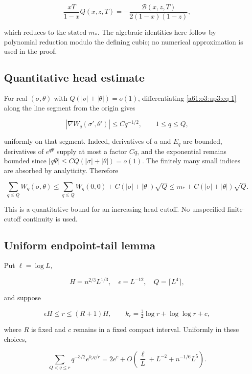 \documentclass[11pt,letterpaper]{article}
\numberwithin{equation}{section}
\theoremstyle{remark}\newtheorem{remark}[theorem]{Remark}
\begin{document}
\[
\frac{xT}{1-x}Q(x,z,T)
 =-\frac{\mathcal B(x,z,T)}{2(1-x)(1-z)},
\]

which reduces to the stated \(m_*\). The algebraic identities here
follow by polynomial reduction modulo the defining cubic; no numerical
approximation is used in the proof.

\subsection{Quantitative head estimate}

For real \((\sigma,\theta)\) with \(Q(|\sigma|+|\theta|)=o(1)\),
differentiating \eqref{a61:o3:up3:eq-1} along the line segment from the origin
gives

\[
|\nabla W_q(\sigma',\theta')|\le Cq^{-1/2},\qquad 1\le q\le Q,
\]

uniformly on that segment. Indeed, derivatives of \(a\) and \(E_q\) are
bounded, derivatives of \(e^{q\Psi}\) supply at most a factor \(Cq\),
and the exponential remains bounded since
\(|q\Psi|\le C Q(|\sigma|+|\theta|)=o(1)\). The finitely many small
indices are absorbed by analyticity. Therefore

\begin{equation}
\sum_{q\le Q}W_q(\sigma,\theta)
 \le \sum_{q\le Q}W_q(0,0)
      +C(|\sigma|+|\theta|)\sqrt Q
 \le m_*+C(|\sigma|+|\theta|)\sqrt Q.
\label{a61:o3:up3:eq-4}
\end{equation}

This is a quantitative bound for an increasing head cutoff. No
unspecified finite-cutoff continuity is used.

\subsection{Uniform endpoint-tail lemma}

Put \(\ell=\log L\),

\[
H=n^{2/3}L^{1/3},\quad \epsilon=L^{-12},\quad Q=\lceil L^4\rceil,
\]

and suppose

\[
\epsilon H\le r\le (R+1)H,\qquad
k_r=\tfrac12\log r+\log\log r+c,
\]

where \(R\) is fixed and \(c\) remains in a fixed compact interval.
Uniformly in these choices,

\begin{equation}
\sum_{Q<q\le r}q^{-3/2}e^{k_rq/r}
 =2e^c+O\!\left(\frac{\ell}{L}+L^{-2}
                  +n^{-1/6}L^5\right).
\label{a61:o3:up3:eq-5}
\end{equation}
\end{document}

